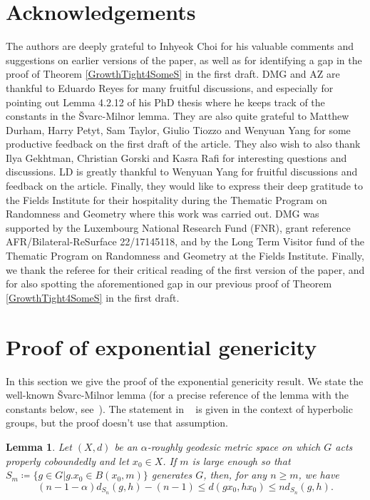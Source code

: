 \documentclass{amsart}
\numberwithin{thm}{section}
\numberwithin{figure}{section}
\newtheorem{lem}[thm]{Lemma}
\theoremstyle{definition}
\theoremstyle{definition}
\theoremstyle{remark}
\numberwithin{equation}{section}
\theoremstyle{plain}
\begin{document}
\section*{Acknowledgements}

The authors are deeply grateful to Inhyeok Choi for his valuable comments and suggestions on earlier versions of the paper, as well as for identifying a gap in the proof of Theorem \ref{GrowthTight4SomeS} in the first draft.
DMG and AZ are thankful to Eduardo Reyes for many fruitful discussions, and especially for pointing out Lemma 4.2.12 of his PhD thesis where he keeps track of the constants in the Švarc-Milnor lemma. They are also quite grateful to Matthew Durham, Harry Petyt, Sam Taylor, Giulio Tiozzo and Wenyuan Yang for some productive feedback on the first draft of the article. They also wish to also thank Ilya Gekhtman, Christian Gorski and Kasra Rafi for interesting questions and discussions. LD is greatly thankful to Wenyuan Yang for fruitful discussions and feedback on the article. Finally, they would like to express their deep gratitude to the Fields Institute for their hospitality during the Thematic Program on Randomness and Geometry where this work was carried out. DMG was supported by the Luxembourg National Research Fund (FNR), grant reference AFR/Bilateral-ReSurface 22/17145118, and by the Long Term Visitor fund of the Thematic Program on Randomness and Geometry at the Fields Institute.
Finally, we thank the referee for their critical reading of the first version of the paper, and for also spotting the aforementioned gap in our previous proof of Theorem \ref{GrowthTight4SomeS} in the first draft.







\section{Proof of exponential genericity}
\label{sec:proofs}

In this section we give the proof of the exponential genericity result. We state the well-known Švarc-Milnor lemma (for a precise reference of the lemma with the constants below, see~\cite[Lemma~4.2.12]{Reyes23:Thesis}). The statement in ~\cite[Lemma~4.2.12]{Reyes23:Thesis} is given in the context of hyperbolic groups, but the proof doesn't use that assumption.



\begin{lem}\label{lem:density} Let $(X,d)$ be an $\alpha$-roughly geodesic metric space on which $G$ acts properly coboundedly and let $x_0 \in X$. If $m$ is large enough so that $S_m \coloneqq \{ g \in G | g. x_0 \in B(x_0,m) \}$ generates $G$, then, for any $ n \geq m$, we have $$(n-1-\alpha)d_{S_n}(g,h)-(n-1) \leq d(gx_0,hx_0) \leq n d_{S_n}(g,h).$$
\end{lem}
\end{document}
